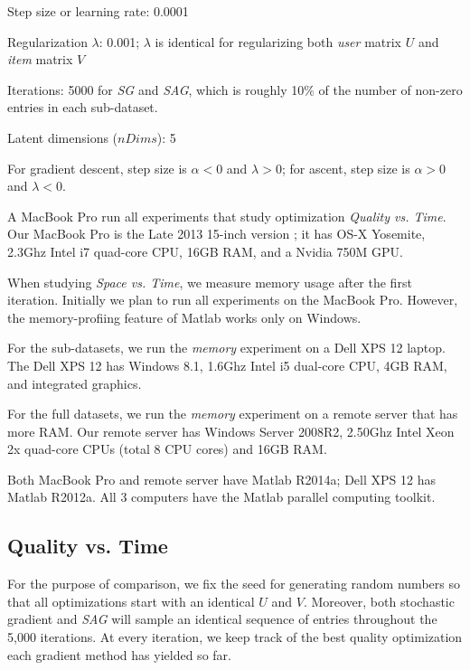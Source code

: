 \begin{sloppy}
\begin{compactitem}
\item Step size or learning rate: 0.0001
\item Regularization $\lambda$: 0.001; $\lambda$ is identical for regularizing both \emph{user} matrix $U$ and \emph{item} matrix $V$
\item Iterations: 5000 for \emph{SG} and \emph{SAG}, which is roughly 10\% of the number of non-zero entries in each sub-dataset.
\item Latent dimensions ($nDims$): 5 
\end{compactitem}
\end{sloppy}

For gradient descent, step size is $\alpha < 0$ and $\lambda > 0$;
for ascent, step size is $\alpha > 0$ and $\lambda < 0$.


A MacBook Pro run all experiments that study optimization \emph{Quality vs. Time}.
Our MacBook Pro is the Late 2013 15-inch version \cite{macbookprolo}; it has OS-X Yosemite, 2.3Ghz Intel i7 quad-core CPU, 16GB RAM, and a Nvidia 750M GPU.

When studying \emph{Space vs. Time}, we measure memory usage after the first iteration.  
Initially we plan to run all experiments on the MacBook Pro.
However, the memory-profiing feature of Matlab works only on Windows.

For the sub-datasets, we run the \emph{memory} experiment on a Dell XPS 12 \cite{dellxps12} laptop.
The Dell XPS 12 has Windows 8.1, 1.6Ghz Intel i5 dual-core CPU, 4GB RAM, and integrated graphics.  

For the full datasets, we run the \emph{memory} experiment on a remote server that has more RAM.
Our remote server has Windows Server 2008R2, 2.50Ghz Intel Xeon 2x quad-core CPUs (total 8 CPU cores) and 16GB RAM.

Both MacBook Pro and remote server have Matlab R2014a; Dell XPS 12 has Matlab R2012a.
All 3 computers have the Matlab parallel computing toolkit.



\subsection{Quality vs. Time}
For the purpose of comparison, we fix the seed for generating random numbers so that all optimizations start with an identical $U$ and $V$.
Moreover, both stochastic gradient and \emph{SAG} will sample an identical sequence of entries throughout the 5,000 iterations.
At every iteration, we keep track of the best quality optimization each gradient method has yielded so far.

